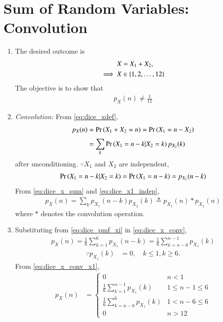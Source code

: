 \documentclass[journal,12pt,twocolumn]{IEEEtran}
\renewcommand\thesection{\arabic{section}}
\begin{document}
\section{Sum of Random Variables: Convolution}
\begin{enumerate}[label=\thesection.\arabic*.,ref=\thesection.\theenumi]
	\item The desired outcome is
\begin{align}
\label{eq:dice_xdef}
X &= X_1 + X_2,
\\
\implies X &\in \cbrak{1,2,\dots,12}
\end{align}
%
The objective is to show that
\begin{align}
p_X(n) \ne \frac{1}{11}
\label{eq:dice_wrong}
\end{align}
\item {\em Convolution: }
From \eqref{eq:dice_xdef},
\begin{align}
p_X(n) &= \pr{X_1 + X_2 = n} = \pr{X_1  = n -X_2}
\\
&= \sum_{k}^{}\pr{X_1  = n -k | X_2 = k}p_{X_2}(k)
\label{eq:dice_x_sum}
\end{align}
after unconditioning.  $\because X_1$ and $X_2$ are independent,
\begin{align}
\pr{X_1  = n -k | X_2 = k} 
= \pr{X_1  = n -k} = p_{X_1}(n-k)
\label{eq:dice_x1_indep}
\end{align}
From \eqref{eq:dice_x_sum} and \eqref{eq:dice_x1_indep},
\begin{align}
p_X(n) = \sum_{k}^{}p_{X_1}(n-k)p_{X_2}(k) \triangleq p_{X_1}(n)*p_{X_2}(n)
\label{eq:dice_x_conv}
\end{align}
where $*$ denotes the convolution operation. 
\item
Substituting from \eqref{eq:dice_pmf_xi}
in \eqref{eq:dice_x_conv},
\begin{align}
p_X(n) = \frac{1}{6}\sum_{k=1}^{6}p_{X_1}(n-k)= \frac{1}{6}\sum_{k=n-6}^{n-1}p_{X_1}(k)
\label{eq:dice_x_conv_x1}
\end{align}
\begin{align}
\because p_{X_1}(k) &= 0, \quad k \le 1, k \ge 6.
\end{align}
From \eqref{eq:dice_x_conv_x1},
%
\begin{align}
p_X(n) &= 
\begin{cases}
0 & n < 1
\\
\frac{1}{6}\sum_{k=1}^{n-1}p_{X_1}(k) &  1 \le n-1 \le  6
\\
\frac{1}{6}\sum_{k=n-6}^{6}p_{X_1}(k) & 1 < n-6 \le 6
\\
0 & n > 12
\end{cases}
\label{eq:dice_x_conv_cond}
\end{align}
\end{enumerate}
\end{document}
